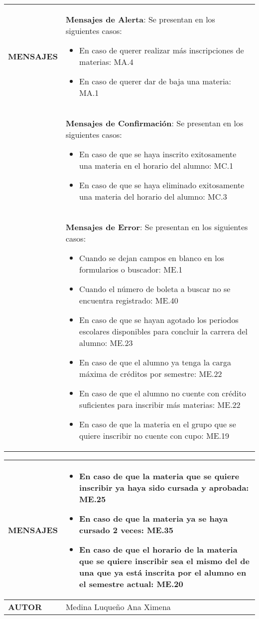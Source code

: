 \begin{longtable}{ | p{6cm} | p{10cm} |}
\hline
\textbf{MENSAJES} & \textbf{Mensajes de Alerta}: Se presentan en los siguientes casos: \begin{itemize}
    \item En caso de querer realizar más inscripciones de materias: MA.4
    \item En caso de querer dar de baja una materia: MA.1
\end{itemize}\\ & \textbf{Mensajes de Confirmación}: Se presentan en los siguientes casos: \begin{itemize}
    \item En caso de que se haya inscrito exitosamente una materia en el horario del alumno: MC.1
    \item En caso de que se haya eliminado exitosamente una materia del horario del alumno: MC.3
\end{itemize}\\ & \textbf{Mensajes de Error}: Se presentan en los siguientes casos: \begin{itemize}
    \item Cuando se dejan campos en blanco en los formularios o buscador: ME.1
    \item Cuando el número de boleta a buscar no se encuentra registrado: ME.40
    \item En caso de que se hayan agotado los periodos escolares disponibles para concluir la carrera del alumno: ME.23
    \item En caso de que el alumno ya tenga la carga máxima de créditos por semestre: ME.22
    \item En caso de que el alumno no cuente con crédito suficientes para inscribir más materias: ME.22
    \item En caso de que la materia en el grupo que se quiere inscribir no cuente con cupo: ME.19
    \end{itemize}\\
\hline
\end{longtable}
\newpage
\begin{longtable}{ | p{6cm} | p{10cm} |}
\hline
\textbf{MENSAJES} & \begin{itemize}
    \item En caso de que la materia que se quiere inscribir ya haya sido cursada y aprobada: ME.25
    \item En caso de que la materia ya se haya cursado 2 veces: ME.35
    \item En caso de que el horario de la materia que se quiere inscribir sea el mismo del de una que ya está inscrita por el alumno en el semestre actual: ME.20
\end{itemize}\\
\hline
\textbf{AUTOR} & Medina Luqueño Ana Ximena\\
\hline
\end{longtable}

